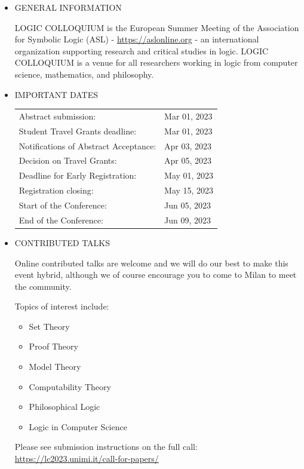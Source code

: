 \documentclass[prodmode,acmtecs]{acmsmall} %
\begin{document}
\begin{itemize}\item  GENERAL INFORMATION 
 
  LOGIC COLLOQUIUM is the European Summer Meeting of the Association for Symbolic Logic (ASL) - \href{https://aslonline.org}{https://aslonline.org} - an international organization supporting research and critical studies in logic. LOGIC COLLOQUIUM is a venue for all researchers working in logic from computer science, mathematics, and philosophy. 
 
\item  IMPORTANT DATES 
 
\begin{tabulary}{\linewidth}{LL}Abstract submission:  & Mar 01, 2023 \\
Student Travel Grants deadline:  & Mar 01, 2023 \\
Notifications of Abstract Acceptance:  & Apr 03, 2023 \\
Decision on Travel Grants:  & Apr 05, 2023 \\
Deadline for Early Registration:  & May 01, 2023 \\
Registration closing:  & May 15, 2023 \\
Start of the Conference:  & Jun 05, 2023 \\
End of the Conference:  & Jun 09, 2023 \\
\end{tabulary}
 
\item  CONTRIBUTED TALKS 
 
  Online contributed talks are welcome and we will do our best to make this event hybrid, although we of course encourage you to come to Milan to meet the community. 
 
  Topics of interest include: 
 
\begin{itemize}\item  Set Theory
\item  Proof Theory
\item  Model Theory
\item  Computability Theory
\item  Philosophical Logic
\item  Logic in Computer Science
\end{itemize} 
  Please see submission instructions on the full call: \href{https://lc2023.unimi.it/call-for-papers/}{https://lc2023.unimi.it/call-for-papers/} 
 

\end{itemize}
\end{document}
